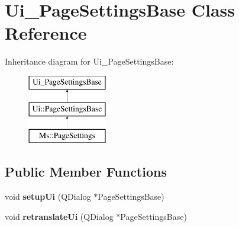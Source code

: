 \hypertarget{class_ui___page_settings_base}{}\section{Ui\+\_\+\+Page\+Settings\+Base Class Reference}
\label{class_ui___page_settings_base}
Inheritance diagram for Ui\+\_\+\+Page\+Settings\+Base\+:\begin{figure}[H]
\begin{center}
\leavevmode
\includegraphics[height=3.000000cm]{class_ui___page_settings_base}
\end{center}
\end{figure}
\subsection*{Public Member Functions}
\begin{DoxyCompactItemize}
\item 
\mbox{\label{class_ui___page_settings_base_aa1d49dda2ae0bd39286aa0e9edbff46b}} 
void {\bfseries setup\+Ui} (Q\+Dialog $\ast$Page\+Settings\+Base)
\item 
\mbox{\label{class_ui___page_settings_base_a85e9048a764e0a1b719833ec676fcaba}} 
void {\bfseries retranslate\+Ui} (Q\+Dialog $\ast$Page\+Settings\+Base)
\end{DoxyCompactItemize}
